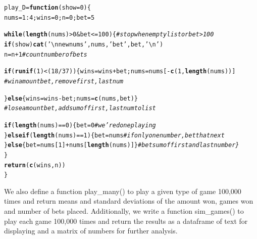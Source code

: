 \documentclass[12pt]{article}\usepackage[]{graphicx}\usepackage[]{color}
\makeatletter
\newcommand{\hlnum}[1]{\textcolor[rgb]{0.686,0.059,0.569}{#1}}%
\newcommand{\hlstr}[1]{\textcolor[rgb]{0.192,0.494,0.8}{#1}}%
\newcommand{\hlcom}[1]{\textcolor[rgb]{0.678,0.584,0.686}{\textit{#1}}}%
\newcommand{\hlopt}[1]{\textcolor[rgb]{0,0,0}{#1}}%
\newcommand{\hlstd}[1]{\textcolor[rgb]{0.345,0.345,0.345}{#1}}%
\newcommand{\hlkwa}[1]{\textcolor[rgb]{0.161,0.373,0.58}{\textbf{#1}}}%
\newcommand{\hlkwb}[1]{\textcolor[rgb]{0.69,0.353,0.396}{#1}}%
\newcommand{\hlkwc}[1]{\textcolor[rgb]{0.333,0.667,0.333}{#1}}%
\newcommand{\hlkwd}[1]{\textcolor[rgb]{0.737,0.353,0.396}{\textbf{#1}}}%
\newenvironment{kframe}{%
 \def\at@end@of@kframe{}%
 \ifinner\ifhmode%
  \def\at@end@of@kframe{\end{minipage}}%
  \begin{minipage}{\columnwidth}%
 \fi\fi%
 \def\FrameCommand##1{\hskip\@totalleftmargin \hskip-\fboxsep
 \colorbox{shadecolor}{##1}\hskip-\fboxsep
     \hskip-\linewidth \hskip-\@totalleftmargin \hskip\columnwidth}%
 \MakeFramed {\advance\hsize-\width
   \@totalleftmargin\z@ \linewidth\hsize
   \@setminipage}}%
 {\par\unskip\endMakeFramed%
 \at@end@of@kframe}
\newenvironment{knitrout}{}{} %
\makeatother
\begin{document}
\begin{knitrout}
\begin{kframe}
\begin{alltt}
\hlstd{play_D} \hlkwb{=} \hlkwa{function}\hlstd{(}\hlkwc{show} \hlstd{=} \hlnum{0}\hlstd{)\{}
  \hlstd{nums}  \hlkwb{=} \hlnum{1}\hlopt{:}\hlnum{4}\hlstd{; wins} \hlkwb{=} \hlnum{0}\hlstd{; n} \hlkwb{=} \hlnum{0}\hlstd{; bet} \hlkwb{=} \hlnum{5}

  \hlkwa{while} \hlstd{(}\hlkwd{length}\hlstd{(nums)} \hlopt{>} \hlnum{0} \hlopt{&} \hlstd{bet} \hlopt{<=} \hlnum{100}\hlstd{)\{} \hlcom{#stop when empty list or bet > 100}
    \hlkwa{if}\hlstd{(show)} \hlkwd{cat}\hlstd{(}\hlstr{'\textbackslash{}nnew nums'}\hlstd{, nums,} \hlstr{'bet'}\hlstd{, bet,} \hlstr{'\textbackslash{}n'}\hlstd{)}
    \hlstd{n} \hlkwb{=} \hlstd{n}\hlopt{+}\hlnum{1} \hlcom{#count number of bets}

    \hlkwa{if}\hlstd{(} \hlkwd{runif}\hlstd{(}\hlnum{1}\hlstd{)} \hlopt{<} \hlstd{(}\hlnum{18}\hlopt{/}\hlnum{37}\hlstd{) )\{ wins} \hlkwb{=} \hlstd{wins}\hlopt{+}\hlstd{bet; nums} \hlkwb{=} \hlstd{nums[}\hlopt{-}\hlkwd{c}\hlstd{(}\hlnum{1}\hlstd{,}\hlkwd{length}\hlstd{(nums))]}
    \hlcom{#win amount bet, remove first, last num}

    \hlstd{\}}\hlkwa{else}\hlstd{\{ wins} \hlkwb{=} \hlstd{wins}\hlopt{-}\hlstd{bet; nums} \hlkwb{=} \hlkwd{c}\hlstd{(nums, bet) \}}
    \hlcom{#lose amount bet, add sum of first, last num to list}

    \hlkwa{if} \hlstd{(}\hlkwd{length}\hlstd{(nums)}\hlopt{==}\hlnum{0}\hlstd{)\{bet} \hlkwb{=} \hlnum{0} \hlcom{#we're done playing}
    \hlstd{\}}\hlkwa{else if} \hlstd{(}\hlkwd{length}\hlstd{(nums)} \hlopt{==} \hlnum{1}\hlstd{)\{bet} \hlkwb{=} \hlstd{nums} \hlcom{#if only one number, bet that next}
    \hlstd{\}}\hlkwa{else}\hlstd{\{bet} \hlkwb{=} \hlstd{nums[}\hlnum{1}\hlstd{]}\hlopt{+}\hlstd{nums[}\hlkwd{length}\hlstd{(nums)]\}} \hlcom{#bet sum of first and last number\}}
  \hlstd{\}}
  \hlkwd{return}\hlstd{(} \hlkwd{c}\hlstd{(wins, n) )}
\hlstd{\}}
\end{alltt}
\end{kframe}
\end{knitrout}

We also define a function play\_many() to play a given type of game 100,000 times and return means and standard deviations of the amount won, games won and number of bets placed. Additionally, we write a function sim\_games() to play each game 100,000 times and return the results as a dataframe of text for displaying and a matrix of numbers for further analysis.
\end{document}
